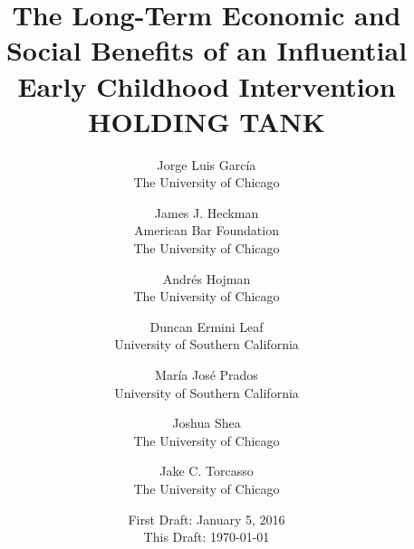 








\begin{titlepage}

\title{\Large \textbf{The Long-Term Economic and Social Benefits of an Influential Early Childhood Intervention\\ HOLDING TANK}}

\author{
Jorge Luis Garc\'{i}a\\
The University of Chicago \and
James J. Heckman \\
American Bar Foundation \\
The University of Chicago \and
Andr\'{e}s Hojman\\
The University of Chicago \and
Duncan Ermini Leaf \\
University of Southern California \and
Mar\'{i}a Jos\'{e} Prados \\
University of Southern California \and
Joshua Shea \\
The University of Chicago \and
Jake C. Torcasso\\
The University of Chicago}
\date{First Draft: January 5, 2016\\ This Draft: \today}

\maketitle

\end{titlepage}

\clearpage

\doublespacing

\setcounter{page}{0}
\

